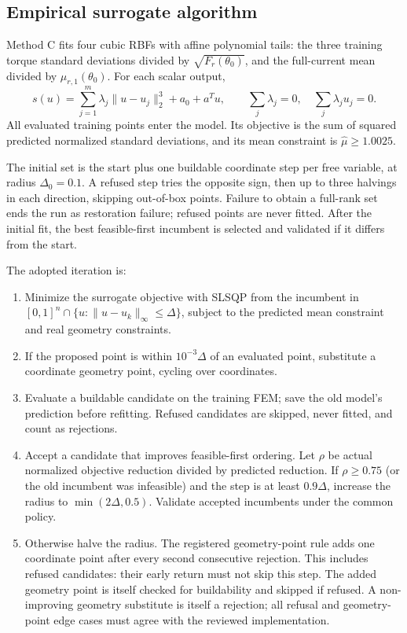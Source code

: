 \subsection{Empirical surrogate algorithm}

Method C fits four cubic RBFs with affine polynomial tails: the three
training torque standard deviations divided by $\sqrt{F_r(\theta_0)}$, and
the full-current mean divided by $\mu_{r,1}(\theta_0)$. For each scalar output,
\begin{equation}
 s(u)=\sum_{j=1}^{m}\lambda_j\lVert u-u_j\rVert_2^3+a_0+a^Tu,
 \qquad \sum_j\lambda_j=0,\quad \sum_j\lambda_j u_j=0.
\end{equation}
All evaluated training points enter the model. Its objective is the sum of
squared predicted normalized standard deviations, and its mean constraint
is $\widehat\mu\geq1.0025$.

The initial set is the start plus one buildable coordinate step per free
variable, at radius $\Delta_0=0.1$. A refused step tries the opposite sign,
then up to three halvings in each direction, skipping out-of-box points.
Failure to obtain a full-rank set ends the run as restoration failure;
refused points are never fitted. After the initial fit, the best feasible-first
incumbent is selected and validated if it differs from the start.

The adopted iteration is:
\begin{enumerate}
\item Minimize the surrogate objective with SLSQP from the incumbent in
$[0,1]^n\cap\{u:\lVert u-u_k\rVert_\infty\leq\Delta\}$, subject to the predicted
mean constraint and real geometry constraints.
\item If the proposed point is within $10^{-3}\Delta$ of an evaluated point,
substitute a coordinate geometry point, cycling over coordinates.
\item Evaluate a buildable candidate on the training FEM; save the old
model's prediction before refitting. Refused candidates are skipped, never
fitted, and count as rejections.
\item Accept a candidate that improves feasible-first ordering. Let
$\rho$ be actual normalized objective reduction divided by predicted
reduction. If $\rho\geq0.75$ (or the old incumbent was infeasible) and the
step is at least $0.9\Delta$, increase the radius to
$\min(2\Delta,0.5)$. Validate accepted incumbents under the common policy.
\item Otherwise halve the radius. The registered geometry-point rule adds
one coordinate point after every second consecutive rejection. This includes
refused candidates: their early return must not skip this step. The added
geometry point is itself checked for buildability and skipped if refused. A
non-improving geometry substitute is itself a rejection; all refusal and
geometry-point edge cases must agree with the reviewed implementation.
\end{enumerate}


